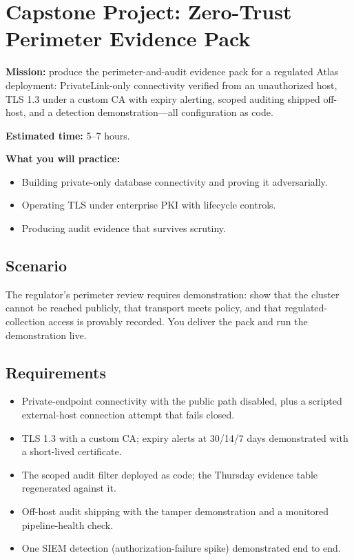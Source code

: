\section{Capstone Project: Zero-Trust Perimeter Evidence Pack}\label{sec:ch19-capstone}

\begin{capstonebox}
\textbf{Mission:} produce the perimeter-and-audit evidence pack for a regulated Atlas deployment: PrivateLink-only connectivity verified from an unauthorized host, TLS 1.3 under a custom CA with expiry alerting, scoped auditing shipped off-host, and a detection demonstration---all configuration as code.

\textbf{Estimated time:} 5--7 hours.

\textbf{What you will practice:}
\begin{itemize}
    \item Building private-only database connectivity and proving it adversarially.
    \item Operating TLS under enterprise PKI with lifecycle controls.
    \item Producing audit evidence that survives scrutiny.
\end{itemize}
\end{capstonebox}

\subsection*{Scenario}
The regulator's perimeter review requires demonstration: show that the cluster cannot be reached publicly, that transport meets policy, and that regulated-collection access is provably recorded. You deliver the pack and run the demonstration live.

\subsection*{Requirements}
\begin{itemize}
    \item Private-endpoint connectivity with the public path disabled, plus a scripted external-host connection attempt that fails closed.
    \item TLS 1.3 with a custom CA; expiry alerts at 30/14/7 days demonstrated with a short-lived certificate.
    \item The scoped audit filter deployed as code; the Thursday evidence table regenerated against it.
    \item Off-host audit shipping with the tamper demonstration and a monitored pipeline-health check.
    \item One SIEM detection (authorization-failure spike) demonstrated end to end.
\end{itemize}

